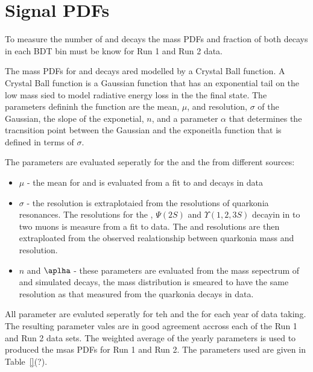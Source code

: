 \section{Signal PDFs}
\label{sec:signalPdfs}

To measure the number of \bdmumu and \bsmumu decays the mass PDFs and fraction of both decays in each BDT bin must be know for Run 1 and Run 2 data.

The mass PDFs for \bdmumu and \bsmumu decays ared modelled by a Crystal Ball function. A Crystal Ball function is a Gaussian function that has an exponential tail on the low mass sied to model radiative energy loss in the the final state. The parameters defininh the function are the mean, $\mu$, and resolution, $\sigma$ of the Gaussian, the slope of the exponetial, $n$, and a parameter $\alpha$ that determines the tracnsition point between the Gaussian and the exponeitla function that is defined in terms of $\sigma$. 

The parameters are evaluated seperatly for the \bs and the \bd from different sources:
\begin{itemize}
\item $\mu$ - the mean for \bs and \bd is evaluated from a fit to \bskk and \bdkpi decays in data
\item $\sigma$ - the resolution is extraplotaied from the resolutions of quarkonia resonances. The resolutions for the \jpsi, $\Psi (2S)$ and $\Upsilon(1, 2, 3S)$ decayin in to two muons is measure from a fit to data. The \bs and \bd resolutions are then extraploated from the observed realationship between quarkonia mass and resolution.
\item $n$ and $\aplha$ - these parameters are evaluated from the mass sepectrum of \bsmumu and \bdmumu simulated decays, the mass distribution is smeared to have the same resolution as that measured from the quarkonia decays in data.
\end{itemize}

All parameter are evaluted seperatly for teh \bd and the \bs for each year of data taking. The resulting parameter vales are in good agreement accross each of the Run 1 and Run 2 data sets. The weighted average of the yearly parameters is used to produced the msas PDFs for Run 1 and Run 2. The parameters used are given in Table~\ref{}(?).




